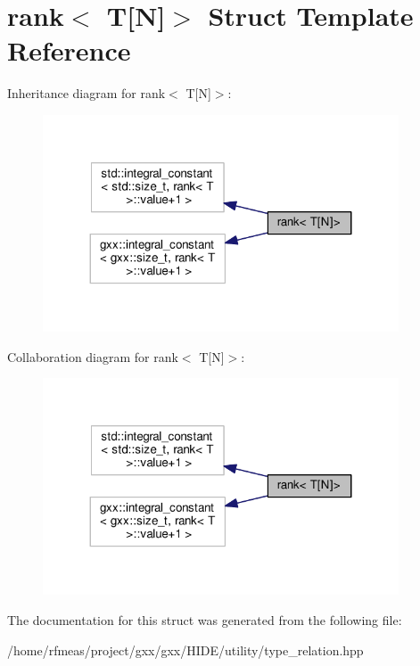 \hypertarget{structrank_3_01T[N]_4}{}\section{rank$<$ T\mbox{[}N\mbox{]}$>$ Struct Template Reference}
\label{structrank_3_01T[N]_4}


Inheritance diagram for rank$<$ T\mbox{[}N\mbox{]}$>$\+:
\nopagebreak
\begin{figure}[H]
\begin{center}
\leavevmode
\includegraphics[width=299pt]{structrank_3_01T[N]_4__inherit__graph}
\end{center}
\end{figure}


Collaboration diagram for rank$<$ T\mbox{[}N\mbox{]}$>$\+:
\nopagebreak
\begin{figure}[H]
\begin{center}
\leavevmode
\includegraphics[width=299pt]{structrank_3_01T[N]_4__coll__graph}
\end{center}
\end{figure}


The documentation for this struct was generated from the following file\+:\begin{DoxyCompactItemize}
\item 
/home/rfmeas/project/gxx/gxx/\+H\+I\+D\+E/utility/type\+\_\+relation.\+hpp\end{DoxyCompactItemize}
